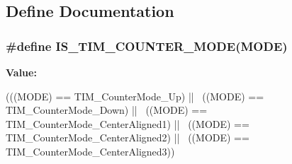 \subsection{Define Documentation}
\hypertarget{group__TIM__Counter__Mode_ga9543fec190793e800d5d1b1b853636f5}{
\subsubsection[{IS\_\-TIM\_\-COUNTER\_\-MODE}]{\setlength{\rightskip}{0pt plus 5cm}\#define IS\_\-TIM\_\-COUNTER\_\-MODE(MODE)}}
\label{group__TIM__Counter__Mode_ga9543fec190793e800d5d1b1b853636f5}
{\bfseries Value:}
\begin{DoxyCode}
(((MODE) == TIM_CounterMode_Up) ||  \
                                   ((MODE) == TIM_CounterMode_Down) || \
                                   ((MODE) == TIM_CounterMode_CenterAligned1) || 
      \
                                   ((MODE) == TIM_CounterMode_CenterAligned2) || 
      \
                                   ((MODE) == TIM_CounterMode_CenterAligned3))
\end{DoxyCode}

